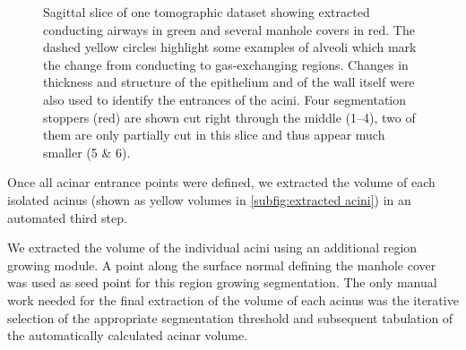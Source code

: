 \documentclass[final,paper=a4,DIV=calc,abstract,english]{scrartcl}
\newlength\imagescale		%
\begin{document}
\begin{figure}
%
	\caption{Sagittal slice of one tomographic dataset showing extracted conducting airways in green and several manhole covers in red.
		The dashed yellow circles highlight some examples of alveoli which mark the change from conducting to gas-exchanging regions.
		Changes in thickness and structure of the epithelium and of the wall itself were also used to identify the entrances of the acini.
		Four segmentation stoppers (red) are shown cut right through the middle (\numrange{1}{4}), two of them are only partially cut in this slice and thus appear much smaller (5 \& 6).}
	\label{fig:ManholeCoverExplanation}
\end{figure}

Once all acinar entrance points were defined, we extracted the volume of each isolated acinus (shown as yellow volumes in \autoref{subfig:extracted acini}) in an automated third step.

We extracted the volume of the individual acini using an additional region growing module.
A point along the surface normal defining the manhole cover was used as seed point for this region growing segmentation.
The only manual work needed for the final extraction of the volume of each acinus was the iterative selection of the appropriate segmentation threshold and subsequent tabulation of the automatically calculated acinar volume.
\end{document}
